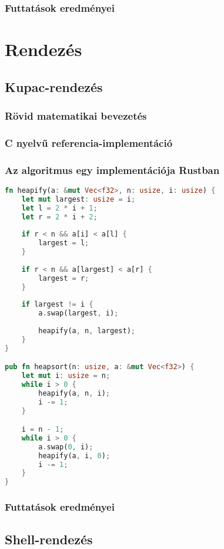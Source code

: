 \subsubsection{Futtatások eredményei} %

\section{Rendezés}

\subsection{Kupac-rendezés}
\subsubsection{Rövid matematikai bevezetés}
\subsubsection{C nyelvű referencia-implementáció}
\begin{cppstyle}
\end{cppstyle}
\subsubsection{Az algoritmus egy implementációja Rustban}
\begin{lstlisting}[language=Rust]
fn heapify(a: &mut Vec<f32>, n: usize, i: usize) {
	let mut largest: usize = i;
	let l = 2 * i + 1;
	let r = 2 * i + 2;
	
	if r < n && a[i] < a[l] {
		largest = l;
	}
	
	if r < n && a[largest] < a[r] {
		largest = r;
	}
	
	if largest != i {
		a.swap(largest, i);
		
		heapify(a, n, largest);
	}
}

pub fn heapsort(n: usize, a: &mut Vec<f32>) {
	let mut i: usize = n;
	while i > 0 {
		heapify(a, n, i);
		i -= 1;
	}

	i = n - 1;
	while i > 0 {
		a.swap(0, i);
		heapify(a, i, 0);
		i -= 1;
	}
}
\end{lstlisting}
\subsubsection{Futtatások eredményei} %

\subsection{Shell-rendezés}

